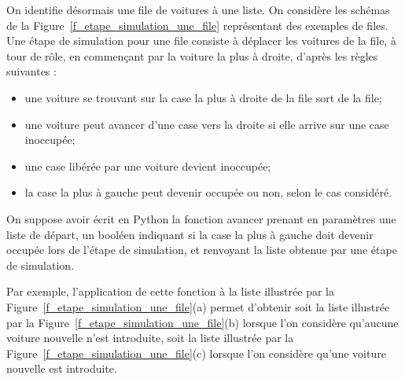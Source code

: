 \ifprof
\else
On identifie désormais une file de voitures à une liste. On considère les schémas de la Figure~\ref{f_etape_simulation_une_file}
représentant des exemples de files. Une étape de simulation pour une file consiste à déplacer les
voitures de la file, à tour de r\^ole, en commen\c cant par la voiture la plus à droite, d'après les règles
suivantes :

\begin{itemize}
	\item  une voiture se trouvant sur la case la plus à droite de la file sort de la file;
    \item  une voiture peut avancer d'une case vers la droite si elle arrive sur une case inoccupée;
    \item  une case libérée par une voiture devient inoccupée;
    \item la case la plus à gauche peut devenir occupée ou non, selon le cas considéré.
\end{itemize}

On suppose avoir écrit en Python la fonction avancer prenant en paramètres une liste de départ,
un booléen indiquant si la case la plus à gauche doit devenir occupée lors de l'étape de simulation,
et renvoyant la liste obtenue par une étape de simulation.


Par exemple, l'application de cette fonction à la liste illustrée par la Figure~\ref{f_etape_simulation_une_file}(a) permet d'obtenir
soit la liste illustrée par la Figure~\ref{f_etape_simulation_une_file}(b) lorsque l'on considère qu'aucune voiture nouvelle n'est
introduite, soit la liste illustrée par la Figure~\ref{f_etape_simulation_une_file}(c) lorsque l'on considère qu'une voiture nouvelle est
introduite.
\fi





